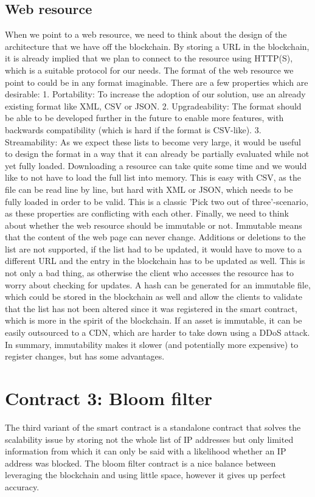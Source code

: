 \subsection{Web resource}
When we point to a web resource, we need to think about the design of the architecture that we have off the blockchain. By storing a URL in the blockchain, it is already implied that we plan to connect to the resource using HTTP(S), which is a suitable protocol for our needs. The format of the web resource we point to could be in any format imaginable. There are a few properties which are desirable: 1. Portability: To increase the adoption of our solution, use an already existing format like XML, CSV or JSON. 2. Upgradeability: The format should be able to be developed further in the future to enable more features, with backwards compatibility (which is hard if the format is CSV-like). 3. Streamability: As we expect these lists to become very large, it would be useful to design the format in a way that it can already be partially evaluated while not yet fully loaded. Downloading a resource can take quite some time and we would like to not have to load the full list into memory. This is easy with CSV, as the file can be read line by line, but hard with XML or JSON, which needs to be fully loaded in order to be valid.
This is a classic 'Pick two out of three'-scenario, as these properties are conflicting with each other.
Finally, we need to think about whether the web resource should be immutable or not. Immutable means that the content of the web page can never change. Additions or deletions to the list are not supported, if the list had to be updated, it would have to move to a different URL and the entry in the blockchain has to be updated as well. This is not only a bad thing, as otherwise the client who accesses the resource has to worry about checking for updates. A hash can be generated for an immutable file, which could be stored in the blockchain as well and allow the clients to validate that the list has not been altered since it was registered in the smart contract, which is more in the spirit of the blockchain. If an asset is immutable, it can be easily outsourced to a CDN, which are harder to take down using a DDoS attack.
In summary, immutability makes it slower (and potentially more expensive) to register changes, but has some advantages.

\section{Contract 3: Bloom filter}
The third variant of the smart contract is a standalone contract that solves the scalability issue by storing not the whole list of IP addresses but only limited information from which it can only be said with a likelihood whether an IP address was blocked. The bloom filter contract is a nice balance between leveraging the blockchain and using little space, however it gives up perfect accuracy.

